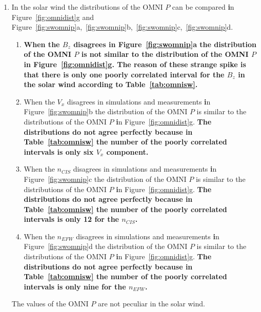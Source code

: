 \documentclass[linenumbers,draft]{agujournal}
\begin{document}
\begin{enumerate}
\item In the solar wind the distributions of the OMNI $P$ can be compared \textbf{i}n Figure~\ref{fig:omnidist}g and Figure~\ref{fig:swomnip}a,~\ref{fig:swomnip}b,~\ref{fig:swomnip}c,~\ref{fig:swomnip}d.
\begin{enumerate}
\item \textbf{When the $B_{z}$ disagrees \textbf{i}n Figure~\ref{fig:swomnip}a the distribution of the OMNI $P$ is not similar to the distribution of the OMNI $P$ \textbf{i}n Figure~\ref{fig:omnidist}g. The reason of these strange spike is that there is only one poorly correlated interval for the $B_{z}$ in the solar wind according to Table~\ref{tab:omnisw}.}
    
\item When the $V_{x}$ disagrees in simulations and measurements \textbf{i}n Figure~\ref{fig:swomnip}b the distribution of the OMNI $P$ is similar to the distributions of the OMNI $P$ \textbf{i}n Figure~\ref{fig:omnidist}g. \textbf{The distributions do not agree perfectly because in Table~\ref{tab:omnisw} the number of the poorly correlated intervals is only six $V_{x}$ component.}

\item When the $n_{CIS}$ disagrees in simulations and measurements \textbf{i}n Figure~\ref{fig:swomnip}c the distribution of the OMNI $P$ is similar to the distributions of the OMNI $P$ \textbf{i}n Figure~\ref{fig:omnidist}g. \textbf{The distributions do not agree perfectly because in Table~\ref{tab:omnisw} the number of the poorly correlated intervals is only 12 for the $n_{CIS}$.}

\item When the $n_{EFW}$ disagrees in simulations and measurements \textbf{i}n Figure~\ref{fig:swomnip}d the distribution of the OMNI $P$ is similar to the distributions of the OMNI $P$ \textbf{i}n Figure~\ref{fig:omnidist}g. \textbf{The distributions do not agree perfectly because in Table~\ref{tab:omnisw} the number of the poorly correlated intervals is only nine for the $n_{EFW}$.}
\end{enumerate}
The values of the OMNI $P$ are not peculiar in the solar wind. 


\end{enumerate}
\end{document}
